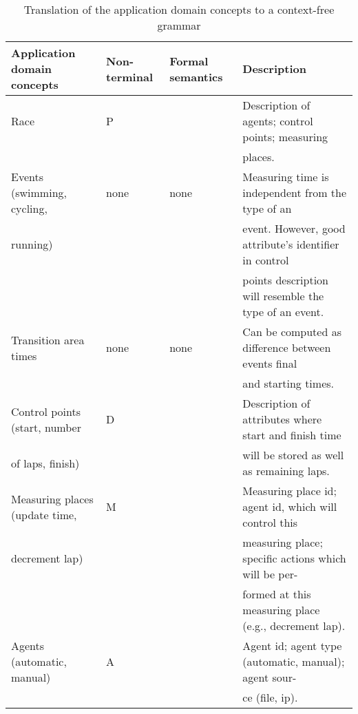 \documentclass[preprint, prX]{revtex4}
\begin{document}
\begin{table*}[htb]        \caption{Translation of the application domain concepts to a context-free grammar}
\label{tab:tab1}
\vspace{-5mm}
\small
\begin{center}
\scalebox{0.7} {
\begin{tabular}{ l  l  l  l }
\hline
Application domain concepts &  Non-terminal & Formal semantics & Description \\
\hline
Race & P &  & Description of agents; control points; measuring \\
 & & & places. \\
\hline
Events (swimming, cycling, & none & none & Measuring time is independent from the type of an \\
running) & & & event. However, good attribute's identifier in control \\
 & & & points description will resemble the type of an event. \\
\hline
Transition area times & none & none & Can be computed as difference between events final \\
 & & & and starting times. \\
\hline
Control points (start, number & D &  & Description of attributes where start and finish time \\
of laps, finish) & & & will be stored as well as remaining laps. \\
\hline
Measuring places (update time, & M &  & Measuring place id; agent id, which will control this \\
decrement lap) & & & measuring place; specific actions which will be per- \\
 & & & formed at this measuring place (e.g., decrement lap). \\
\hline
Agents (automatic, manual) & A &  & Agent id; agent type (automatic, manual); agent sour- \\
 & & & ce (file, ip). \\
\hline
\end{tabular}
}
\end{center}
\normalsize
\vspace{-5mm}
\end{table*}
\end{document}
